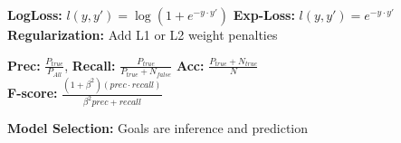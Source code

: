 \textbf{LogLoss:} $l(y, y') = \log(1 + e^{-y\cdot y'})$
\textbf{Exp-Loss:} $l(y, y') = e^{-y\cdot y'}$\\

\textbf{Regularization:} Add L1 or L2 weight penalties\\
\begin{comment}
	In NN we have enough parameters to overfit the data, with weight penalties, we introduce a penalty when the noise is fitted to closely. The regularizations can be seen as prior assumptions of the weights in the bayesian setting.
	Other forms of penaltisation are Weight Decay, Dropout and Early Stopping.\\
\end{comment}

\textbf{Prec:} $\frac{P_{true}}{P_{All}}$, \textbf{Recall:} $\frac{P_{true}}{P_{true} + N_{false}}$ \textbf{Acc:} $\frac{P_{true} + N_{true}}{N}$\\
\textbf{F-score:} $\frac{(1+\beta^2)(prec \cdot recall)}{\beta^2 prec + recall}$\\
\begin{comment}
	The F-score models a tradeoff between the precision and the recall.\\
\end{comment}

\begin{comment}
	\textbf{Intrinsic vs. Extrinsic:} Evaluate based on an appropriate metric or the performance of the final task.\\
\end{comment}


\textbf{Model Selection:} Goals are inference and prediction\\
\begin{comment}
	Inference is explaining the underlying process how the data was generated, we want the model that does this best.
	The predictive performance is meassured on data it has never seen before.\\
	Models can be good for one metric, but bad for the other. For example, NN's often perform very good, but can't describe the underlying process due to a lack of interpretability.\\
	
	\textbf{Issues:} Multiple testing with the same parameters increase the probability for a statistical outliner. 
	Another reason for overestimation of the performance is when the model has access to the test data, therefore overfitting to it.
\end{comment} 


